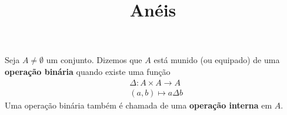 \documentclass{beamer}
\title{An\'eis}
\author[\autor]{\autor}
\institute[\instituto]{\instituto}
\date{}
\begin{document}
    \begin{frame}
        \maketitle
    \end{frame}


    \begin{frame}
        \begin{definicao}
            Seja $A \ne \emptyset$ um conjunto. \pause Dizemos que $A$ est{\'a} munido \pause (ou equipado) \pause de
            uma \textbf{opera{\c c}{\~a}o bin{\'a}ria} \pause quando existe uma fun{\c c}{\~a}o\pause
            \begin{align*}
                &\Delta : A \times A \to A\\
                &(a,b) \longmapsto a\Delta b
            \end{align*}
            \pause Uma opera{\c c}{\~a}o bin{\'a}ria tamb{\'e}m {\'e} chamada de uma \textbf{opera{\c c}{\~a}o interna} em $A$.\pause
        \end{definicao}
    \end{frame}
\end{document}
